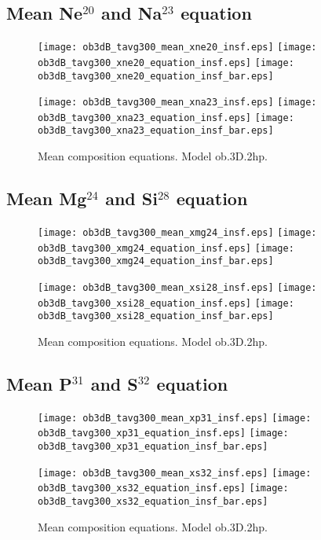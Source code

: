 \documentclass[10pt,paper=a4]{report}
\begin{document}
\newpage

\subsection{Mean Ne$^{20}$ and Na$^{23}$ equation}

\begin{figure}[!h]
\centerline{
\texttt{[image: ob3dB\_tavg300\_mean\_xne20\_insf.eps]}
\texttt{[image: ob3dB\_tavg300\_xne20\_equation\_insf.eps]}
\texttt{[image: ob3dB\_tavg300\_xne20\_equation\_insf\_bar.eps]}}

\centerline{
\texttt{[image: ob3dB\_tavg300\_mean\_xna23\_insf.eps]}
\texttt{[image: ob3dB\_tavg300\_xna23\_equation\_insf.eps]}
\texttt{[image: ob3dB\_tavg300\_xna23\_equation\_insf\_bar.eps]}}
\caption{Mean composition equations. Model {\sf ob.3D.2hp}. \label{fig:xo16-xne20-equations}}
\end{figure}


\newpage

\subsection{Mean Mg$^{24}$ and Si$^{28}$ equation}

\begin{figure}[!h]
\centerline{
\texttt{[image: ob3dB\_tavg300\_mean\_xmg24\_insf.eps]}
\texttt{[image: ob3dB\_tavg300\_xmg24\_equation\_insf.eps]}
\texttt{[image: ob3dB\_tavg300\_xmg24\_equation\_insf\_bar.eps]}}

\centerline{
\texttt{[image: ob3dB\_tavg300\_mean\_xsi28\_insf.eps]}
\texttt{[image: ob3dB\_tavg300\_xsi28\_equation\_insf.eps]}
\texttt{[image: ob3dB\_tavg300\_xsi28\_equation\_insf\_bar.eps]}}
\caption{Mean composition equations. Model {\sf ob.3D.2hp}. \label{fig:xna23-xmg24-equations}}
\end{figure}

\newpage

\subsection{Mean P$^{31}$ and S$^{32}$ equation}

\begin{figure}[!h]
\centerline{
\texttt{[image: ob3dB\_tavg300\_mean\_xp31\_insf.eps]}
\texttt{[image: ob3dB\_tavg300\_xp31\_equation\_insf.eps]}
\texttt{[image: ob3dB\_tavg300\_xp31\_equation\_insf\_bar.eps]}}

\centerline{
\texttt{[image: ob3dB\_tavg300\_mean\_xs32\_insf.eps]}
\texttt{[image: ob3dB\_tavg300\_xs32\_equation\_insf.eps]}
\texttt{[image: ob3dB\_tavg300\_xs32\_equation\_insf\_bar.eps]}}
\caption{Mean composition equations. Model {\sf ob.3D.2hp}. \label{fig:xsi28-xp31-equations}}
\end{figure}
\end{document}
